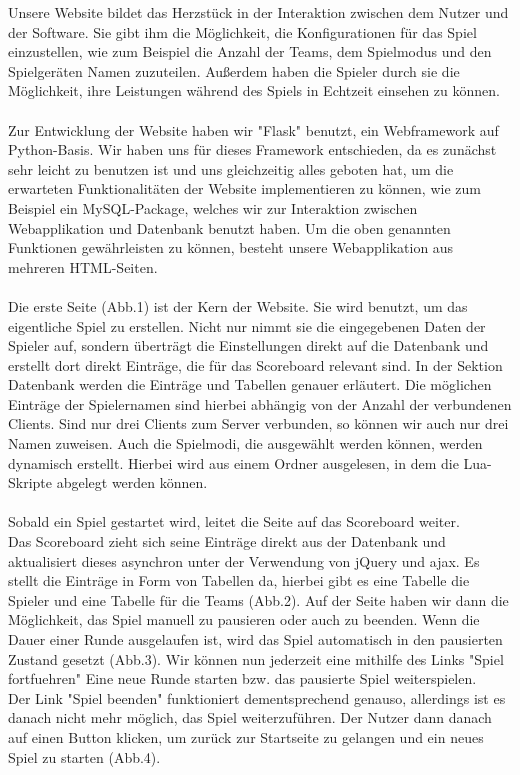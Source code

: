 Unsere Website bildet das Herzstück in der Interaktion zwischen dem Nutzer und der Software. Sie gibt ihm die Möglichkeit, die Konfigurationen für das Spiel einzustellen, wie zum Beispiel die Anzahl der Teams, dem Spielmodus und den Spielgeräten Namen zuzuteilen. Außerdem haben die Spieler durch sie die Möglichkeit, ihre Leistungen während des Spiels in Echtzeit einsehen zu können.\\\\
Zur Entwicklung der Website haben wir "Flask" benutzt, ein Webframework auf Python-Basis. Wir haben uns für dieses Framework entschieden, da es zunächst sehr leicht zu benutzen ist und uns gleichzeitig alles geboten hat, um die erwarteten Funktionalitäten der Website implementieren zu können, wie zum Beispiel ein MySQL-Package, welches wir zur Interaktion zwischen Webapplikation und Datenbank benutzt haben.
Um die oben genannten Funktionen gewährleisten zu können, besteht unsere Webapplikation aus mehreren HTML-Seiten.\\\\
Die erste Seite (Abb.1) ist der Kern der Website. Sie wird benutzt, um das eigentliche Spiel zu erstellen. Nicht nur nimmt sie die eingegebenen Daten der Spieler auf, sondern überträgt die Einstellungen direkt auf die Datenbank und erstellt dort direkt Einträge, die für das Scoreboard relevant sind. In der Sektion Datenbank werden die Einträge und Tabellen genauer erläutert. Die möglichen Einträge der Spielernamen sind hierbei abhängig von der Anzahl der verbundenen Clients. Sind nur drei Clients zum Server verbunden, so können wir auch nur drei Namen zuweisen.
Auch die Spielmodi, die ausgewählt werden können, werden dynamisch erstellt. Hierbei wird aus einem Ordner ausgelesen, in dem die Lua-Skripte abgelegt werden können.\\\\
Sobald ein Spiel gestartet wird, leitet die Seite auf das Scoreboard weiter.\\ Das Scoreboard zieht sich seine Einträge direkt aus der Datenbank und aktualisiert dieses asynchron unter der Verwendung von jQuery und ajax. Es stellt die Einträge in Form von Tabellen da, hierbei gibt es eine Tabelle die Spieler und eine Tabelle für die Teams (Abb.2). Auf der Seite haben wir dann die Möglichkeit, das Spiel manuell zu pausieren oder auch zu beenden. Wenn die Dauer einer Runde ausgelaufen ist, wird das Spiel automatisch in den pausierten Zustand gesetzt (Abb.3). Wir können nun jederzeit eine mithilfe des Links "Spiel fortfuehren" Eine neue Runde starten bzw. das pausierte Spiel weiterspielen.\\
Der Link "Spiel beenden" funktioniert dementsprechend genauso, allerdings ist es danach nicht mehr möglich, das Spiel weiterzuführen. Der Nutzer dann danach auf einen Button klicken, um zurück zur Startseite zu gelangen und ein neues Spiel zu starten (Abb.4).\\\\

